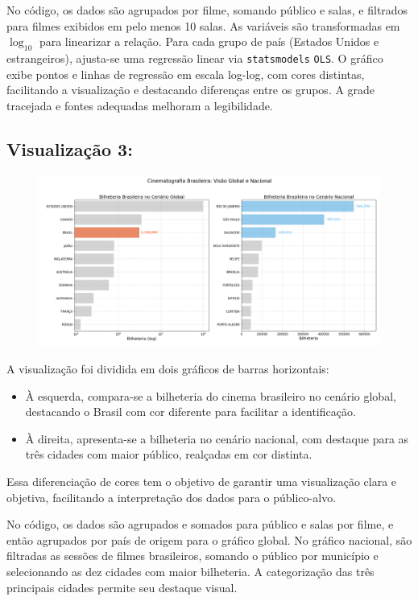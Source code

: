 \documentclass{article}
\begin{document}
No código, os dados são agrupados por filme, somando público e salas, e filtrados para filmes exibidos em pelo menos 10 salas. As variáveis são transformadas em \(\log_{10}\) para linearizar a relação. Para cada grupo de país (Estados Unidos e estrangeiros), ajusta-se uma regressão linear via \texttt{statsmodels} \texttt{OLS}. O gráfico exibe pontos e linhas de regressão em escala log-log, com cores distintas, facilitando a visualização e destacando diferenças entre os grupos. A grade tracejada e fontes adequadas melhoram a legibilidade.

\subsection*{Visualização 3:}
\begin{figure}[H]
    \centerline{\includegraphics[width = \linewidth]{img/Figure_3.png}}
\end{figure}
A visualização foi dividida em dois gráficos de barras horizontais:

\begin{itemize}
    \item À esquerda, compara-se a bilheteria do cinema brasileiro no cenário global, destacando o Brasil com cor diferente para facilitar a identificação.
    \item À direita, apresenta-se a bilheteria no cenário nacional, com destaque para as três cidades com maior público, realçadas em cor distinta.
\end{itemize}

Essa diferenciação de cores tem o objetivo de garantir uma visualização clara e objetiva, facilitando a interpretação dos dados para o público-alvo.

\vspace{0.3cm}

No código, os dados são agrupados e somados para público e salas por filme, e então agrupados por país de origem para o gráfico global. No gráfico nacional, são filtradas as sessões de filmes brasileiros, somando o público por município e selecionando as dez cidades com maior bilheteria. A categorização das três principais cidades permite seu destaque visual.
\end{document}
